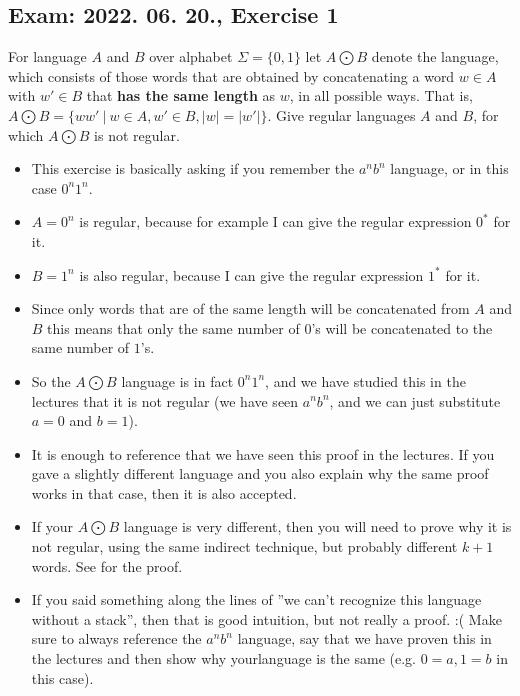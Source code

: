\subsection{Exam: 2022. 06. 20., Exercise 1}


For language $A$ and $B$ over alphabet $\Sigma = \{0,1\}$ let $A \bigodot B$ denote the language, which consists of those words that are obtained by concatenating a word $w \in{} A$ with $w' \in{} B$ that \textbf{has the same length} as $w$, in all possible ways. That is, $A \bigodot B = \{ ww' ~|~ w \in{} A, w' \in{} B, |w| = |w'|\}$. Give regular languages $A$ and $B$, for which $A \bigodot{} B$ is not regular.


\begin{itemize}
    \item This exercise is basically asking if you remember the $a^nb^n$ language, or in this case $0^n1^n$.
    \item $A=0^n$ is regular, because for example I can give the regular expression $0^*$ for it.
    \item $B=1^n$ is also regular, because I can give the regular expression $1^*$ for it.
    \item Since only words that are of the same length will be concatenated from $A$ and $B$ this means that only the same number of $0$'s will be concatenated to the same number of $1$'s.
    \item So the $A \bigodot B$ language is in fact $0^n1^n$, and we have studied this in the lectures that it is not regular (we have seen $a^nb^n$, and we can just substitute $a=0$ and $b=1$).
    \item It is enough to reference that we have seen this proof in the lectures. If you gave a slightly different language and you also explain why the same proof works in that case, then it is also accepted.
    \item If your $A \bigodot B$ language is very different, then you will need to prove why it is not regular, using the same indirect technique, but probably different $k+1$ words. See  for the proof.
    \item If you said something along the lines of ''we can't recognize this language without a stack'', then that is good intuition, but not really a proof. :( Make sure to always reference the $a^nb^n$ language, say that we have proven this in the lectures and then show why yourlanguage is the same (e.g. $0=a, 1=b$ in this case).
\end{itemize}

